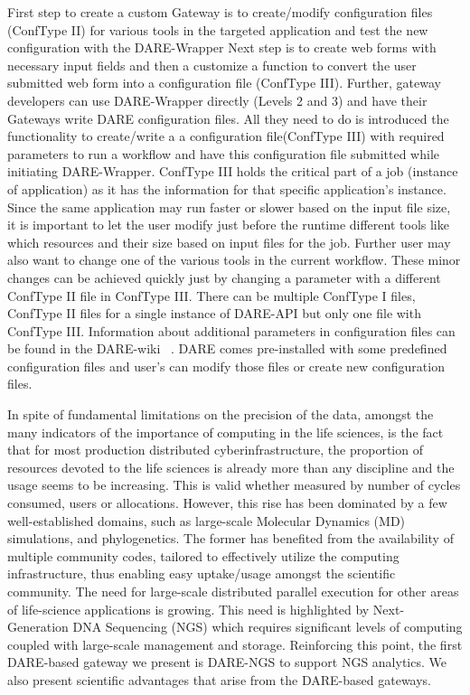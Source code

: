 \documentclass[]{svjour3}
\begin{document}
First step to create a custom Gateway is to create/modify
configuration files (ConfType II) for various tools in the targeted
application and test the new configuration with the DARE-Wrapper Next
step is to create web forms with necessary input fields and then a
customize a function to convert the user submitted web form into a
configuration file (ConfType III).  Further, gateway developers can
use DARE-Wrapper directly (Levels 2 and 3) and have their Gateways
write DARE configuration files.  All they need to do is introduced the
functionality to create/write a a configuration file(ConfType III)
with required parameters to run a workflow and have this configuration
file submitted while initiating DARE-Wrapper. ConfType III holds the
critical part of a job (instance of application) as it has the
information for that specific application's instance. Since the same
application may run faster or slower based on the input file size, it
is important to let the user modify just before the runtime different
tools like which resources and their size based on input files for the
job. Further user may also want to change one of the various tools in
the current workflow. These minor changes can be achieved quickly just
by changing a parameter with a different ConfType II file in ConfType
III.  There can be multiple ConfType I files, ConfType II files for a
single instance of DARE-API but only one file with ConfType III.
Information about additional parameters in configuration files can be
found in the DARE-wiki ~\cite{dare_api_web}.
DARE comes pre-installed with some predefined configuration files and
user's can modify those files or create new configuration files.


In spite of fundamental limitations on the precision of the data,
amongst the many indicators of the importance of computing in the life
sciences, is the fact that for most production distributed
cyberinfrastructure, the proportion of resources devoted to the life
sciences is already more than any discipline and the usage seems to be
increasing. This is valid whether measured by number of cycles
consumed, users or allocations.  However, this rise has been dominated
by a few well-established domains, such as large-scale Molecular
Dynamics (MD) simulations, and phylogenetics.  The former has
benefited from the availability of multiple community codes, tailored
to effectively utilize the computing infrastructure, thus enabling
easy uptake/usage amongst the scientific community.  The need for
large-scale distributed parallel execution for other areas of
life-science applications is growing.  This need is highlighted by
Next-Generation DNA Sequencing (NGS) which requires significant levels
of computing coupled with large-scale management and storage.
Reinforcing this point, the first DARE-based gateway we present is
DARE-NGS to support NGS analytics. We also present scientific
advantages that arise from the DARE-based gateways.
\end{document}
